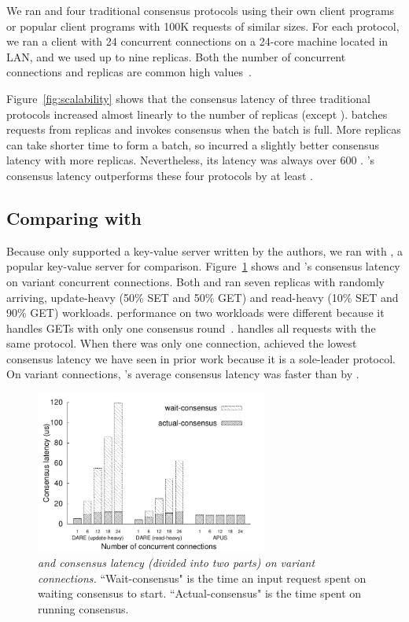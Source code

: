 We ran \xxx and four traditional consensus protocols using their own 
client programs or popular client programs with 100K requests of similar sizes. 
For each protocol, we ran a client with 24 concurrent connections on a 24-core 
machine located in LAN, and we used up to nine replicas. Both the number of 
concurrent connections and replicas are common high 
values~\cite{zookeeper,crane:sosp15,rex:eurosys14,dare:hpdc15}.

Figure~\ref{fig:scalability} shows that the consensus latency of three 
traditional protocols increased almost linearly to the number of replicas 
(except \spaxos). \spaxos batches requests from replicas and invokes consensus 
when the batch is full. More replicas can take shorter time to form a batch, so 
\spaxos incurred a slightly better consensus latency with more replicas. 
Nevertheless, its latency was always over 600 \us. \xxx's consensus latency 
outperforms these four protocols by at least \comptradlow.

\subsection{Comparing with \dare}
\label{sec:eval-dare}
Because \dare only supported a key-value server written by the 
authors, we ran \xxx with \redis, a popular key-value server for comparison.
Figure~\ref{fig:compare} shows \xxx and 
\dare's consensus latency on variant concurrent connections. Both \xxx and 
\dare ran seven replicas with randomly arriving, update-heavy (50\% SET 
and 50\% GET) and read-heavy (10\% SET and 90\% GET) workloads. \dare 
performance on two workloads were different because it handles GETs with only 
one consensus round~\cite{dare:hpdc15}. \xxx handles all requests with the same 
protocol. When there was only one connection, \dare achieved the lowest 
consensus latency we have seen in prior work because it is a sole-leader 
protocol. On variant connections, \xxx's average 
consensus latency was faster than \dare by \fasterDARE.

\begin{figure}[h]
\begin{center}
\includegraphics[width=3in]{figures/server-processing-compare}
\caption{{\em \xxx and \dare consensus latency (divided into two parts) on 
variant connections.} 
``Wait-consensus" is the time an input request spent on waiting consensus to 
start. ``Actual-consensus" is the time spent on running consensus.}
\label{fig:compare}
\end{center}
\end{figure}

